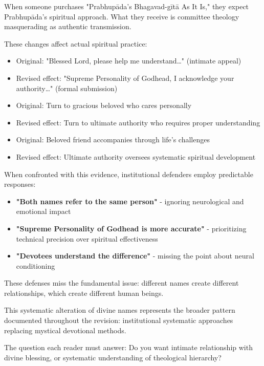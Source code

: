 \documentclass[12pt,twoside]{book}
\begin{document}
When someone purchases "Prabhupāda's Bhagavad-gītā As It Is," they expect Prabhupāda's spiritual approach. What they receive is committee theology masquerading as authentic transmission.

These changes affect actual spiritual practice:

\begin{itemize}
\item Original: "Blessed Lord, please help me understand\ldots{}" (intimate appeal)
\item Revised effect: "Supreme Personality of Godhead, I acknowledge your authority\ldots{}" (formal submission)

\item Original: Turn to gracious beloved who cares personally
\item Revised effect: Turn to ultimate authority who requires proper understanding

\item Original: Beloved friend accompanies through life's challenges
\item Revised effect: Ultimate authority oversees systematic spiritual development
\end{itemize}

When confronted with this evidence, institutional defenders employ predictable responses:

\begin{itemize}
\item \textbf{\textbf{"Both names refer to the same person"}} - ignoring neurological and emotional impact
\item \textbf{\textbf{"Supreme Personality of Godhead is more accurate"}} - prioritizing technical precision over spiritual effectiveness
\item \textbf{\textbf{"Devotees understand the difference"}} - missing the point about neural conditioning
\end{itemize}

These defenses miss the fundamental issue: different names create different relationships, which create different human beings.

This systematic alteration of divine names represents the broader pattern documented throughout the revision: institutional systematic approaches replacing mystical devotional methods.

The question each reader must answer: Do you want intimate relationship with divine blessing, or systematic understanding of theological hierarchy?
\end{document}
